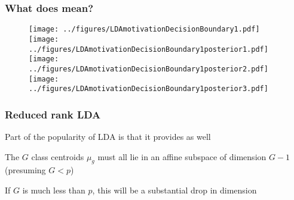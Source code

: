 \documentclass[12pt]{beamer}
\begin{document}
\begin{frame}[fragile]
\frametitle{What does  mean?}
\begin{figure}
\centering
\texttt{[image: ../figures/LDAmotivationDecisionBoundary1.pdf]}
\texttt{[image: ../figures/LDAmotivationDecisionBoundary1posterior1.pdf]}\\
\texttt{[image: ../figures/LDAmotivationDecisionBoundary1posterior2.pdf]}
\texttt{[image: ../figures/LDAmotivationDecisionBoundary1posterior3.pdf]}
\end{figure}
\end{frame}




\begin{frame}
\frametitle{Reduced rank LDA}
Part of the popularity of LDA is that it provides  as well

\vsp
The $G$ class centroids $\mu_g$ must all lie in an affine subspace of dimension $G-1$ (presuming
$G < p$)


\vsp
If $G$ is much less than $p$, this will be a substantial drop in dimension
\end{frame}
\end{document}
